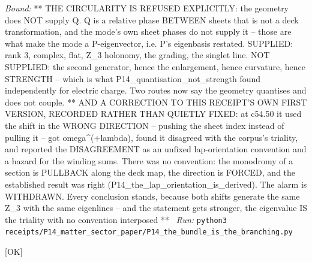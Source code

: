 \begin{description}
 \emph{Bound:} ** THE CIRCULARITY IS REFUSED EXPLICITLY: the geometry does NOT supply Q. Q is a relative phase BETWEEN sheets that is not a deck transformation, and the mode's own sheet phases do not supply it -- those are what make the mode a P-eigenvector, i.e. P's eigenbasis restated. SUPPLIED: rank 3, complex, flat, Z\_3 holonomy, the grading, the singlet line. NOT SUPPLIED: the second generator, hence the enlargement, hence curvature, hence STRENGTH -- which is what P14\_quantisation\_not\_strength found independently for electric charge. Two routes now say the geometry quantises and does not couple. ** AND A CORRECTION TO THIS RECEIPT'S OWN FIRST VERSION, RECORDED RATHER THAN QUIETLY FIXED: at c54.50 it used the shift in the WRONG DIRECTION -- pushing the sheet index instead of pulling it -- got omega\textasciicircum{}(+lambda), found it disagreed with the corpus's triality, and reported the DISAGREEMENT as an unfixed lap-orientation convention and a hazard for the winding sums. There was no convention: the monodromy of a section is PULLBACK along the deck map, the direction is FORCED, and the established result was right (P14\_the\_lap\_orientation\_is\_derived). The alarm is WITHDRAWN. Every conclusion stands, because both shifts generate the same Z\_3 with the same eigenlines -- and the statement gets stronger, the eigenvalue IS the triality with no convention interposed **
\ \emph{Run:} \texttt{python3 receipts/P14\_matter\_sector\_paper/P14\_the\_bundle\_is\_the\_branching.py}
\item[\label{rcpt:P14_the_lap_orientation_is_derived}\texttt{P14\_the\_lap\_orientation\_is\_derived}]\hfill\textsf{[OK]}\\

\end{description}
